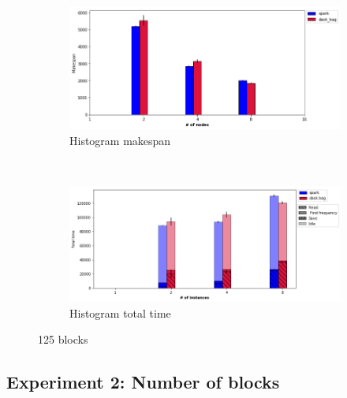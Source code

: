 \documentclass[conference]{IEEEtran}
\begin{document}
\begin{figure}[!t]
    \centering
    \begin{subfigure}[b]{\columnwidth}
        \includegraphics[clip,width=\columnwidth]{images/histo_instance.png}%
        \caption{Histogram makespan}\label{fig:histo_ms_worker}
    \end{subfigure}
    \\
    \begin{subfigure}[b]{\columnwidth}
        \includegraphics[clip,width=\columnwidth]{images/histo_idle_instances.png}%
        \caption{Histogram total time}\label{fig:histo_tt_worker}
    \end{subfigure}
    \caption{125 blocks}
\end{figure}

\subsection{Experiment 2: Number of blocks}
\end{document}
